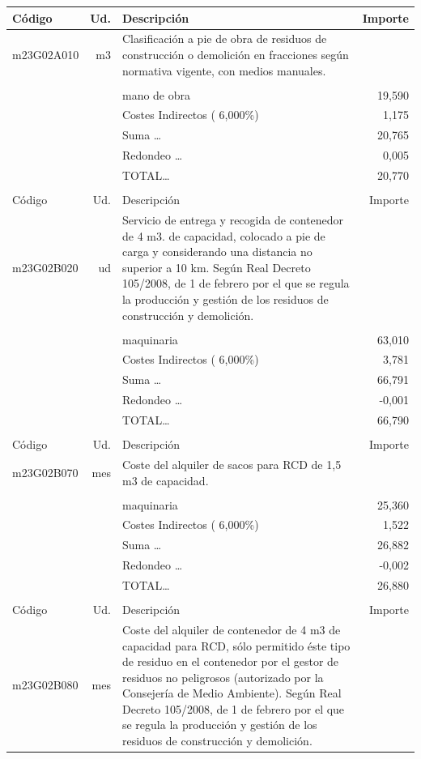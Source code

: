 \begin{supertabular}{l r p{60mm} r}
Código&Ud.&Descripción&Importe\\%
\hline%
m23G02A010&m3&Clasificación a pie de obra de residuos de construcción o demolición en fracciones según normativa vigente, con medios manuales.&\\%
&&&\\%
&&mano de obra&    19,590\\%
&&Costes Indirectos (     6,000\%)&     1,175\\%
&&Suma \ldots&    20,765\\%
&&Redondeo \ldots&     0,005\\%
%
&&TOTAL\ldots&    20,770\\%
&&&\\%
Código&Ud.&Descripción&Importe\\%
\hline%
m23G02B020&ud&Servicio de entrega y recogida de contenedor de 4 m3. de capacidad, colocado a pie de carga y considerando una distancia no superior a 10 km. Según Real Decreto 105/2008, de 1 de febrero por el que se regula la producción y gestión de los residuos de construcción y demolición.&\\%
&&&\\%
&&maquinaria&    63,010\\%
&&Costes Indirectos (     6,000\%)&     3,781\\%
&&Suma \ldots&    66,791\\%
&&Redondeo \ldots&    {-}0,001\\%
%
&&TOTAL\ldots&    66,790\\%
&&&\\%
Código&Ud.&Descripción&Importe\\%
\hline%
m23G02B070&mes&Coste del alquiler de sacos para RCD de 1,5 m3 de capacidad.&\\%
&&&\\%
&&maquinaria&    25,360\\%
&&Costes Indirectos (     6,000\%)&     1,522\\%
&&Suma \ldots&    26,882\\%
&&Redondeo \ldots&    {-}0,002\\%
%
&&TOTAL\ldots&    26,880\\%
&&&\\%
Código&Ud.&Descripción&Importe\\%
\hline%
m23G02B080&mes&Coste del alquiler de contenedor de 4 m3 de capacidad para RCD, sólo permitido éste tipo de residuo en el contenedor por el gestor de residuos no peligrosos (autorizado por la Consejería de Medio Ambiente). Según Real Decreto 105/2008, de 1 de febrero por el que se regula la producción y gestión de los residuos de construcción y demolición.&\\%

\end{supertabular}
